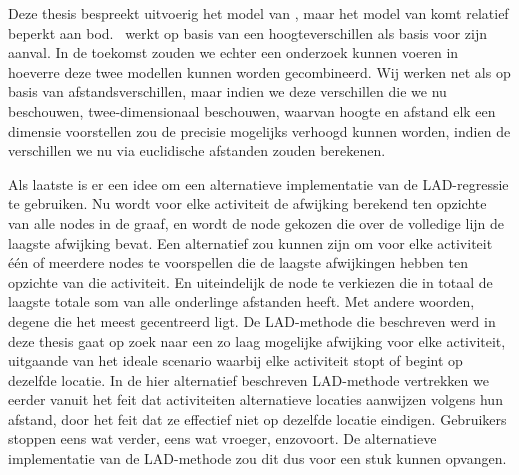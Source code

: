 Deze thesis bespreekt uitvoerig het model van \citeauthor{Dhondt}, maar het
model van \citeauthor{Verdonck_2022} komt relatief beperkt aan bod.\
\citeauthor{Verdonck_2022} werkt op basis van een hoogteverschillen als basis
voor zijn aanval. In de toekomst zouden we echter een onderzoek kunnen voeren
in hoeverre deze twee modellen kunnen worden gecombineerd. Wij werken net als
\citeauthor{Dhondt} op basis van afstandsverschillen, maar indien we deze
verschillen die we nu beschouwen, twee-dimensionaal beschouwen, waarvan hoogte
en afstand elk een dimensie voorstellen zou de precisie mogelijks verhoogd
kunnen worden, indien de verschillen we nu via euclidische afstanden zouden
berekenen.

Als laatste is er een idee om een alternatieve implementatie van de
\ac{LAD}-regressie te gebruiken. Nu wordt voor elke activiteit de afwijking
berekend ten opzichte van alle nodes in de graaf, en wordt de node gekozen die
over de volledige lijn de laagste afwijking bevat. Een alternatief zou kunnen
zijn om voor elke activiteit één of meerdere nodes te voorspellen die de
laagste afwijkingen hebben ten opzichte van die activiteit. En uiteindelijk de
node te verkiezen die in totaal de laagste totale som van alle onderlinge
afstanden heeft. Met andere woorden, degene die het meest gecentreerd ligt. De
\ac{LAD}-methode die beschreven werd in deze thesis gaat op zoek naar een zo
laag mogelijke afwijking voor elke activiteit, uitgaande van het ideale
scenario waarbij elke activiteit stopt of begint op dezelfde locatie. In de
hier alternatief beschreven \ac{LAD}-methode vertrekken we eerder vanuit het
feit dat activiteiten alternatieve locaties aanwijzen volgens hun afstand, door
het feit dat ze effectief niet op dezelfde locatie eindigen. Gebruikers stoppen
eens wat verder, eens wat vroeger, enzovoort. De alternatieve implementatie van
de \ac{LAD}-methode zou dit dus voor een stuk kunnen opvangen.



